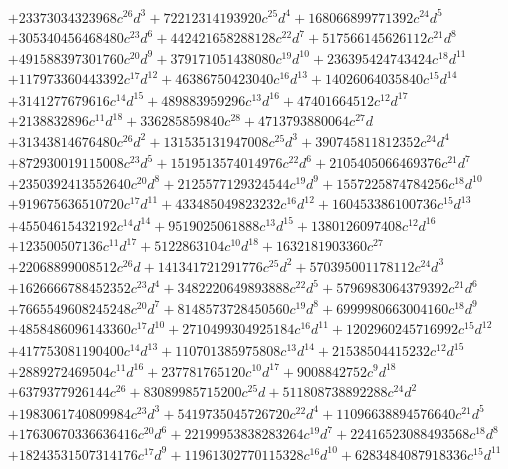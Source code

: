 {\begin{align*}
&+23373034323968c^{26}d^{3}+72212314193920c^{25}d^{4}+168066899771392c^{24}d^{5}\\
&+305340456468480c^{23}d^{6}+442421658288128c^{22}d^{7}+517566145626112c^{21}d^{8}\\
&+491588397301760c^{20}d^{9}+379171051438080c^{19}d^{10}+236395424743424c^{18}d^{11}\\
&+117973360443392c^{17}d^{12}+46386750423040c^{16}d^{13}+14026064035840c^{15}d^{14}\\
&+3141277679616c^{14}d^{15}+489883959296c^{13}d^{16}+47401664512c^{12}d^{17}\\
&+2138832896c^{11}d^{18}+336285859840c^{28}+4713793880064c^{27}d\\
&+31343814676480c^{26}d^{2}+131535131947008c^{25}d^{3}+390745811812352c^{24}d^{4}\\
&+872930019115008c^{23}d^{5}+1519513574014976c^{22}d^{6}+2105405066469376c^{21}d^{7}\\
&+2350392413552640c^{20}d^{8}+2125577129324544c^{19}d^{9}+1557225874784256c^{18}d^{10}\\
&+919675636510720c^{17}d^{11}+433485049823232c^{16}d^{12}+160453386100736c^{15}d^{13}\\
&+45504615432192c^{14}d^{14}+9519025061888c^{13}d^{15}+1380126097408c^{12}d^{16}\\
&+123500507136c^{11}d^{17}+5122863104c^{10}d^{18}+1632181903360c^{27}\\
&+22068899008512c^{26}d+141341721291776c^{25}d^{2}+570395001178112c^{24}d^{3}\\
&+1626666788452352c^{23}d^{4}+3482220649893888c^{22}d^{5}+5796983064379392c^{21}d^{6}\\
&+7665549608245248c^{20}d^{7}+8148573728450560c^{19}d^{8}+6999980663004160c^{18}d^{9}\\
&+4858486096143360c^{17}d^{10}+2710499304925184c^{16}d^{11}+1202960245716992c^{15}d^{12}\\
&+417753081190400c^{14}d^{13}+110701385975808c^{13}d^{14}+21538504415232c^{12}d^{15}\\
&+2889272469504c^{11}d^{16}+237781765120c^{10}d^{17}+9008842752c^{9}d^{18}\\
&+6379377926144c^{26}+83089985715200c^{25}d+511808738892288c^{24}d^{2}\\
&+1983061740809984c^{23}d^{3}+5419735045726720c^{22}d^{4}+11096638894576640c^{21}d^{5}\\
&+17630670336636416c^{20}d^{6}+22199953838283264c^{19}d^{7}+22416523088493568c^{18}d^{8}\\
&+18243531507314176c^{17}d^{9}+11961302770115328c^{16}d^{10}+6283484087918336c^{15}d^{11}\\

\end{align*}}
